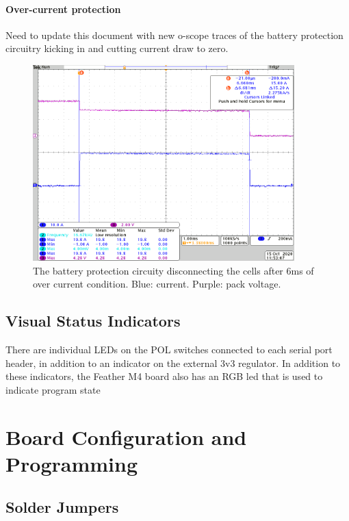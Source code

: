 \documentclass{article}
\begin{document}
\paragraph{Over-current protection}
Need to update this document with new o-scope traces of the battery protection circuitry kicking in and cutting current draw to zero.


\begin{figure}[H]
	\centering
	\includegraphics[width=0.9\textwidth]{images/over-current.png}
	\caption{The battery protection circuity disconnecting the cells after 6ms of over current condition. Blue: current. Purple: pack voltage.}
	\label{fig:over-current}
\end{figure}



\subsection{Visual Status Indicators}
There are individual LEDs on the POL switches connected to each serial port header, in addition to an indicator on the external 3v3 regulator. In addition to these indicators, the Feather M4 board also has an RGB led that is used to indicate program state



\section{Board Configuration and Programming}

\subsection{Solder Jumpers}
\end{document}
